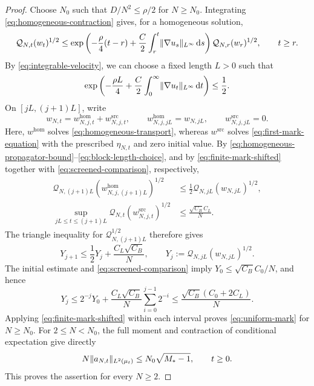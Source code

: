 \documentclass[11pt,reqno]{amsart}
\numberwithin{equation}{section}
\theoremstyle{plain}
\theoremstyle{remark}
\DeclarePairedDelimiter{\norm}{\lVert}{\rVert}
\begin{document}
\begin{proof}
Choose $N_0$ such that $D/N^2\le\rho/2$ for $N\ge N_0$. Integrating \eqref{eq:homogeneous-contraction} gives, for a homogeneous solution,
\begin{equation}\label{eq:homogeneous-propagator-bound}
 \mathcal Q_{N,t}(w_t)^{1/2}
 \le \exp\left(-\frac\rho4(t-r)+\frac C2\int_r^t\norm{\nabla u_s}_{L^\infty}\dd s\right)
                 \mathcal Q_{N,r}(w_r)^{1/2},\qquad t\ge r.
\end{equation}
By \eqref{eq:integrable-velocity}, we can choose a fixed length $L>0$ such that
\begin{equation}\label{eq:block-length-choice}
 \exp\left(-\frac{\rho L}4+\frac C2\int_0^\infty\norm{\nabla u_t}_{L^\infty}\dd t\right)\le\frac12.
\end{equation}
On $[jL,(j+1)L]$, write
\begin{equation}\label{eq:mark-interval-decomposition}
 w_{N,t}=w_{N,j,t}^{\mathrm{hom}}+w_{N,j,t}^{\mathrm{src}},\qquad
 w_{N,j,jL}^{\mathrm{hom}}=w_{N,jL},\qquad w_{N,j,jL}^{\mathrm{src}}=0.
\end{equation}
Here, $w^{\mathrm{hom}}$ solves \eqref{eq:homogeneous-transport}, whereas $w^{\mathrm{src}}$ solves \eqref{eq:first-mark-equation} with the prescribed $\eta_{N,t}$ and zero initial value. By \eqref{eq:homogeneous-propagator-bound}--\eqref{eq:block-length-choice}, and by \eqref{eq:finite-mark-shifted} together with \eqref{eq:screened-comparison}, respectively,
\begin{align}
 \mathcal Q_{N,(j+1)L}(w_{N,j,(j+1)L}^{\mathrm{hom}})^{1/2}
 &\le\frac12\mathcal Q_{N,jL}(w_{N,jL})^{1/2},
 \label{eq:mark-homogeneous-interval-bound}\\
 \sup_{jL\le t\le(j+1)L}\mathcal Q_{N,t}(w_{N,j,t}^{\mathrm{src}})^{1/2}
 &\le\frac{\sqrt{C_B}C_L}N.
 \label{eq:mark-source-interval-bound}
\end{align}
The triangle inequality for $\mathcal Q_{N,(j+1)L}^{1/2}$ therefore gives
\begin{equation}\label{eq:block-recurrence}
 Y_{j+1}\le\frac12Y_j+\frac{C_L\sqrt{C_B}}N,
                   \qquad Y_j:=\mathcal Q_{N,jL}(w_{N,jL})^{1/2}.
\end{equation}
The initial estimate and \eqref{eq:screened-comparison} imply $Y_0\le\sqrt{C_B}C_0/N$, and hence
\begin{equation}\label{eq:block-summation}
 Y_j\le 2^{-j}Y_0+\frac{C_L\sqrt{C_B}}N\sum_{i=0}^{j-1}2^{-i}
 \le\frac{\sqrt{C_B}(C_0+2C_L)}N.
\end{equation}
Applying \eqref{eq:finite-mark-shifted} within each interval proves \eqref{eq:uniform-mark} for $N\ge N_0$. For $2\le N<N_0$, the full moment and contraction of conditional expectation give directly
\begin{equation}\label{eq:uniform-mark-small-N}
 N\norm{a_{N,t}}_{L^2(\mu_t)}\le N_0\sqrt{M_*-1},\qquad t\ge0.
\end{equation}
This proves the assertion for every $N\ge2$.
\end{proof}
\end{document}
